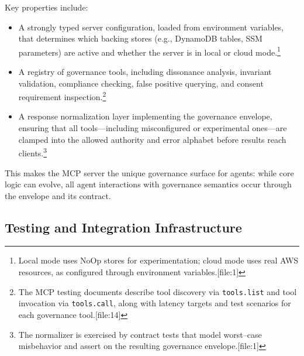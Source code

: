 \documentclass[11pt]{article}
\begin{document}
Key properties include:
\begin{itemize}[leftmargin=*]
  \item A strongly typed server configuration, loaded from environment variables, that determines which backing stores (e.g., DynamoDB tables, SSM parameters) are active and whether the server is in local or cloud mode.\footnote{Local mode uses NoOp stores for experimentation; cloud mode uses real AWS resources, as configured through environment variables.[file:1]} 
  \item A registry of governance tools, including dissonance analysis, invariant validation, compliance checking, false positive querying, and consent requirement inspection.\footnote{The MCP testing documents describe tool discovery via \texttt{tools.list} and tool invocation via \texttt{tools.call}, along with latency targets and test scenarios for each governance tool.[file:14]} 
  \item A response normalization layer implementing the governance envelope, ensuring that all tools---including misconfigured or experimental ones---are clamped into the allowed authority and error alphabet before results reach clients.\footnote{The normalizer is exercised by contract tests that model worst--case misbehavior and assert on the resulting governance envelope.[file:1]} 
\end{itemize}

This makes the MCP server the unique governance surface for agents: while core logic can evolve, all agent interactions with governance semantics occur through the envelope and its contract.

\subsection{Testing and Integration Infrastructure}
\end{document}

